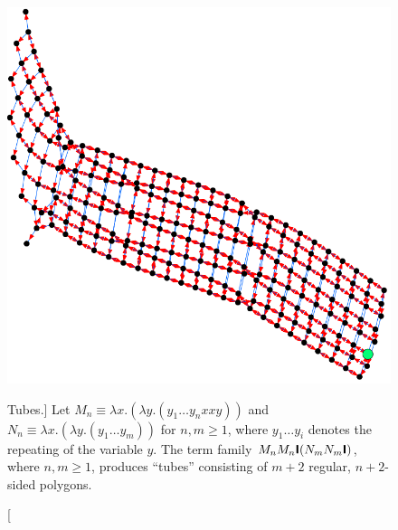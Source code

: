 \begin{figure}[htbp]
{		\includegraphics[height=\exampleheight]{../images/Tube_long_NEATO.png}
	}
	\caption
	[Tubes.]
	{Let $M_n\equiv\lambda x.(\lambda y.(y_1\hdots y_n x x y))$ and $N_n\equiv\lambda x.(\lambda y.(y_1\hdots y_m))$
	for $n,m\geq 1$, where $y_1\hdots y_i$ denotes the repeating of the variable $y$. 
	The term family $M_n M_n \textsf{\textbf{I}} (N_m N_m \textsf{\textbf{I}})$, where $n,m\geq 1$, produces
	``tubes'' consisting of $m+2$ regular, $n+2$-sided polygons.}
	\label{fig:images_Tube31_NEATO}
\end{figure}

